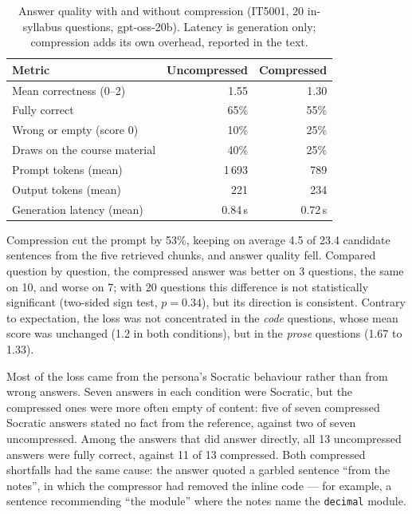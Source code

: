 \begin{table}[htb]
  \centering
  \caption{Answer quality with and without compression (IT5001, 20
           in-syllabus questions, gpt-oss-20b). Latency is generation only;
           compression adds its own overhead, reported in the text.}
  \label{eval:tab:quality}
  \begin{tabular}{l r r}
    \hline
    \textbf{Metric} & \textbf{Uncompressed} & \textbf{Compressed} \\
    \hline
    Mean correctness (0--2)          & 1.55   & 1.30   \\
    Fully correct                    & 65\%   & 55\%   \\
    Wrong or empty (score 0)         & 10\%   & 25\%   \\
    Draws on the course material     & 40\%   & 25\%   \\
    Prompt tokens (mean)             & 1\,693 & 789    \\
    Output tokens (mean)             & 221    & 234    \\
    Generation latency (mean)        & 0.84\,s & 0.72\,s \\
    \hline
  \end{tabular}
\end{table}

Compression cut the prompt by 53\%, keeping on average 4.5 of 23.4 candidate
sentences from the five retrieved chunks, and answer quality fell. Compared
question by question, the compressed answer was better on 3 questions, the
same on 10, and worse on 7; with 20 questions this difference is not
statistically significant (two-sided sign test, $p = 0.34$), but its
direction is consistent. Contrary to expectation, the loss was not
concentrated in the \emph{code} questions, whose mean score was unchanged
(1.2 in both conditions), but in the \emph{prose} questions (1.67 to 1.33).

Most of the loss came from the persona's Socratic behaviour rather than from
wrong answers. Seven answers in each condition were Socratic, but the
compressed ones were more often empty of content: five of seven compressed
Socratic answers stated no fact from the reference, against two of seven
uncompressed. Among the answers that did answer directly, all 13
uncompressed answers were fully correct, against 11 of 13 compressed. Both
compressed shortfalls had the same cause: the answer quoted a garbled sentence
``from the notes'', in which the compressor had removed the inline code ---
for example, a sentence recommending ``the module'' where the notes name the
\texttt{decimal} module.

